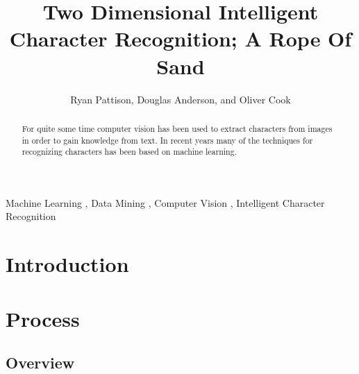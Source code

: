 \documentclass[preprint,5p,times,twocolumn]{elsarticle}
\begin{document}
\begin{frontmatter}

\title{Two Dimensional Intelligent Character Recognition; A Rope Of Sand}


\author[ryan,doug,oliver]{Ryan Pattison, Douglas Anderson, and Oliver Cook}

\address[ryan]{ryan.m.pattison@gmail.com}
\address[doug]{dander01@uoguelph.ca}
\address[oliver]{cooko@uoguelph.ca}


\begin{abstract}

For quite some time computer vision has been used to extract characters from
images in order to gain knowledge from text. In recent years many of the
techniques for recognizing characters has been based on machine learning.

\end{abstract}

\begin{keyword}
Machine Learning \sep
Data Mining \sep
Computer Vision \sep
Intelligent Character Recognition


\end{keyword}

\end{frontmatter}


\section{Introduction}
\label{intro}
\lipsum[1-2]


\section{Process}
\label{process}

\subsection{Overview}
\label{process:overview}
\lipsum[1-3]
\end{document}

